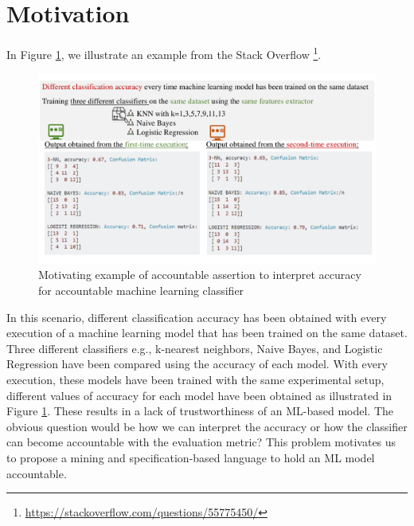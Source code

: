 \section{Motivation}
\label{sec:motivation}

In Figure \ref{fig:motiv}, we illustrate an example from the Stack Overflow  \footnote{\small \url{https://stackoverflow.com/questions/55775450/}}.
\begin{figure}[h]
	\includegraphics[width=\linewidth]{motivfigure.pdf}
	\caption{Motivating example of accountable assertion to interpret accuracy for accountable machine learning classifier}
	\label{fig:motiv}
\end{figure}

In this scenario, different classification accuracy has been obtained with every execution of a machine learning model that has been trained on the same dataset. Three different classifiers e.g., k-nearest neighbors, Naive Bayes, and Logistic Regression have been compared using the accuracy of each model. With every execution, these models have been trained with the same experimental setup, different values of accuracy for each model have been obtained as illustrated in Figure \ref{fig:motiv}. These results in a lack of trustworthiness of an ML-based model. The obvious question would be how we can interpret the accuracy or how the classifier can become accountable with the evaluation metric? This problem motivates us to propose a mining and specification-based language to hold an ML model accountable.  

%
%
%
%
%
